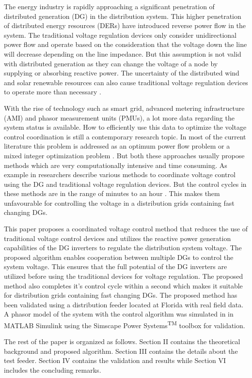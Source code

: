 The energy industry is rapidly approaching a significant penetration of distributed generation (DG) in the distribution system. This higher penetration of distributed energy resources (DERs) have introduced reverse power flow in the system. The traditional voltage regulation devices only consider unidirectional power flow and operate based on the consideration that the voltage down the line will decrease depending on the line impedance. But this assumption is not valid with distributed generation as they can change the voltage of a node by supplying or absorbing reactive power. The uncertainty of the distributed wind and solar renewable resources can also cause traditional voltage regulation devices to operate more than necessary \cite{int1}. 

With the rise of technology such as smart grid, advanced metering infrastructure (AMI) and phasor measurement units (PMUs), a lot more data regarding the system status is available. How to efficiently use this data to optimize the voltage control coordination is still a contemporary research topic. In most of the current literature this problem is addressed as an optimum power flow problem or a mixed integer optimization problem \cite{int2}. But both these approaches usually propose methods which are very computationally intensive and time consuming. As example in \cite{LR5,LR1,LR2,LR3} researchers describe various methods to coordinate voltage control using the DG and traditional voltage regulation devices. But the control cycles in these methods are in the range of minutes to an hour \cite{LR4}. This makes them unfavourable for controlling the voltage in a distribution grids containing fast changing DGs.

This paper proposes a coordinated voltage control method that reduces the use of traditional voltage control devices and utilizes the reactive power generation capabilities of the DG inverters  to regulate the distribution system voltage.  The proposed algorithm enables cooperation between multiple DGs to control the system voltage. This ensures that the full potential of the DG inverters are utilized before using the traditional devices for voltage regulation. The proposed method also completes it's control cycle within a second which makes it suitable for distribution grids containing fast changing DGs. The proposed method has been validated using a distribution feeder located at Florida with real field data. A phasor model of the system with the control algorithm was simulated in in MATLAB\textsuperscript{\textregistered} Simulink\textsuperscript{\textregistered} using the Simscape Power Systems\textsuperscript{TM} toolbox for validation.

The rest of the paper is organized as follows. Section II contains the theoretical background and proposed algorithm. Section III contains the details about the test feeder. Section IV contains the validation and results while Section VI includes the concluding remarks.